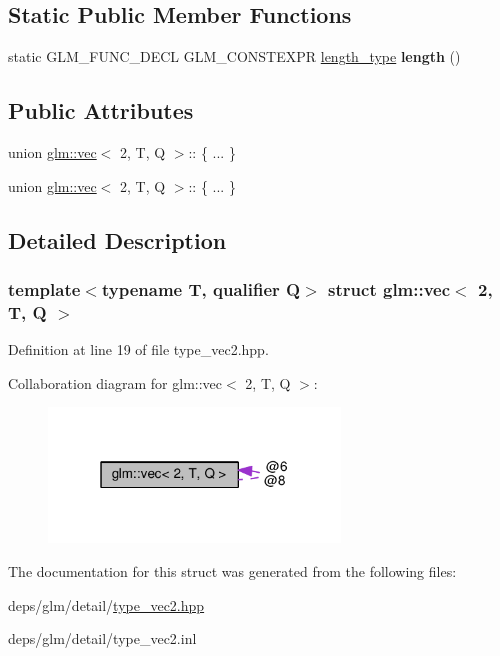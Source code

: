 \subsection*{Static Public Member Functions}
\begin{DoxyCompactItemize}
\item 
\mbox{\label{structglm_1_1vec_3_012_00_01T_00_01Q_01_4_a93fee4eb07a69842caff0d41acf83ddd}} 
static G\+L\+M\+\_\+\+F\+U\+N\+C\+\_\+\+D\+E\+CL G\+L\+M\+\_\+\+C\+O\+N\+S\+T\+E\+X\+PR \hyperlink{structglm_1_1vec_3_012_00_01T_00_01Q_01_4_af8b652526ec88c8513b2a8c05bf92441}{length\+\_\+type} {\bfseries length} ()
\end{DoxyCompactItemize}
\subsection*{Public Attributes}
\begin{DoxyCompactItemize}
\item 
\mbox{\label{structglm_1_1vec_3_012_00_01T_00_01Q_01_4_a6e168be78dc31d8cb0de77a202defe06}} 
union \hyperlink{structglm_1_1vec}{glm\+::vec}$<$ 2, T, Q $>$\+:: \{ ... \}  
\item 
\mbox{\label{structglm_1_1vec_3_012_00_01T_00_01Q_01_4_a7cbe7ed079b5bab0a58a2ea6a997dafd}} 
union \hyperlink{structglm_1_1vec}{glm\+::vec}$<$ 2, T, Q $>$\+:: \{ ... \}  
\end{DoxyCompactItemize}


\subsection{Detailed Description}
\subsubsection*{template$<$typename T, qualifier Q$>$\newline
struct glm\+::vec$<$ 2, T, Q $>$}



Definition at line 19 of file type\+\_\+vec2.\+hpp.



Collaboration diagram for glm\+:\+:vec$<$ 2, T, Q $>$\+:
\nopagebreak
\begin{figure}[H]
\begin{center}
\leavevmode
\includegraphics[width=220pt]{df/dac/structglm_1_1vec_3_012_00_01T_00_01Q_01_4__coll__graph}
\end{center}
\end{figure}


The documentation for this struct was generated from the following files\+:\begin{DoxyCompactItemize}
\item 
deps/glm/detail/\hyperlink{type__vec2_8hpp}{type\+\_\+vec2.\+hpp}\item 
deps/glm/detail/type\+\_\+vec2.\+inl\end{DoxyCompactItemize}
